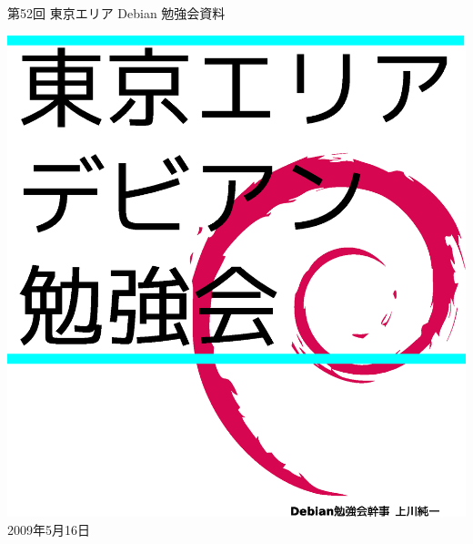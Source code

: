 \documentclass[mingoth,a4paper]{jsarticle}
\newcommand{\debmtgyear}{2009}
\newcommand{\debmtgmonth}{5}
\newcommand{\debmtgdate}{16}
\newcommand{\debmtgnumber}{52}
\begin{document}
\begin{titlepage}
\thispagestyle{empty}


\vspace*{-2cm}
第\debmtgnumber{}回 東京エリア Debian 勉強会資料

\hspace*{-2.4cm}
\includegraphics[width=210mm]{image200801/2008title.eps}\\
\hfill{}\debmtgyear{}年\debmtgmonth{}月\debmtgdate{}日

\end{titlepage}

\end{document}
